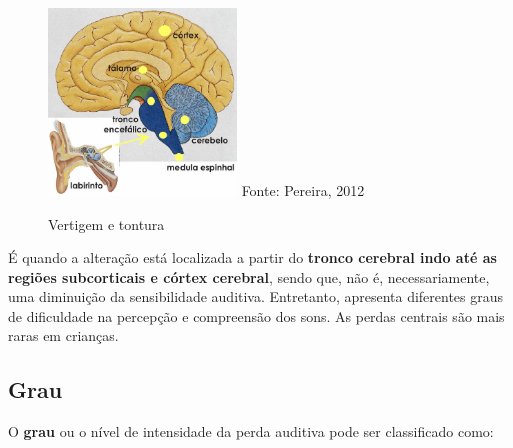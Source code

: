\documentclass[brasil]{abnt}
\begin{document}
\begin{itemize}
						\begin{figure}[h]
							\caption{Vertigem e tontura}
							\center
							\includegraphics[width=5cm]{pace.png}
							\center Fonte: Pereira, 2012
						\end{figure}
						
						É quando a alteração está localizada a partir do \textbf{tronco cerebral indo até as regiões subcorticais e córtex cerebral}, sendo que, não é, necessariamente, uma diminuição da sensibilidade auditiva. Entretanto, apresenta
						diferentes graus de dificuldade na percepção e compreensão dos sons. As perdas centrais são mais raras em crianças.
					
				\end{itemize}
					
									
			\subsection{Grau}
				O \textbf{grau} ou o nível de intensidade da perda auditiva pode ser classificado como:
							
\end{document}
